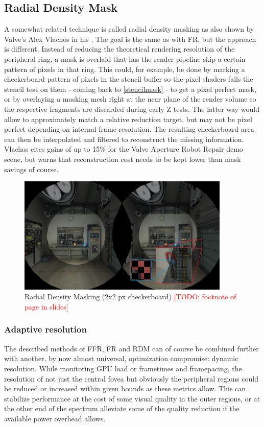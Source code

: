 \subsection{Radial Density Mask}
A somewhat related technique is called radial density masking as also shown by Valve's Alex Vlachos in his \cite{Vlachos.2016c}. The goal is the same as with FR, but the approach is different. Instead of reducing the theoretical rendering resolution of the peripheral ring, a mask is overlaid that has the render pipeline skip a certain pattern of pixels in that ring. This could, for example, be done by marking a checkerboard pattern of pixels in the stencil buffer so the pixel shaders fails the stencil test on them - coming back to \autoref{stencilmask} - to get a pixel perfect mask, or by overlaying a masking mesh right at the near plane of the render volume so the respective fragments are discarded during early Z tests. The latter way would allow to approximately match a relative reduction target, but may not be pixel perfect depending on internal frame resolution. 
The resulting checkerboard area can then be interpolated and filtered to reconstruct the missing information. 
Vlachos cites gains of up to 15\% for the Valve Aperture Robot Repair demo scene, but warns that reconstruction cost needs to be kept lower than mask savings of course. \\

\begin{figure}[!htb]
  \centering
  \includegraphics[width=0.9\textwidth]{pictures/vlachos_RDM}
  \caption{Radial Density Masking (2x2 px checkerboard)\cite{Vlachos.2016c} \textcolor{red}{[TODO: footnote of page in slides]}} \label{fig:vlachos_RDM}
\end{figure} 

\subsubsection{Adaptive resolution}
The described methods of FFR, FR and RDM can of course be combined further with another, by now almost universal, optimization compromise: dynamic resolution. While monitoring GPU load or frametimes and framepacing, the resolution of not just the central fovea but obviously the peripheral regions could be reduced or increased within given bounds as these metrics allow. This can stabilize performance at the cost of some visual quality in the outer regions, or at the other end of the spectrum alleviate some of the quality reduction if the available power overhead allows. 

